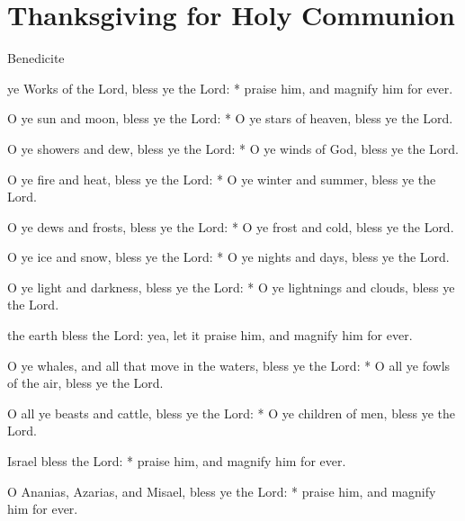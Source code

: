 \fancyhead[RE,LO]{}
\section{Thanksgiving for Holy Communion}\label{CommunionThanksgiving}%
\begin{multicols}{2}\par\noindent
{}
\begin{inhead}
	Benedicite
\end{inhead}
 ye Works of the Lord, bless ye the Lord: * praise him, and magnify him for ever.\par
{}

    O ye sun and moon, bless ye the Lord: * O ye stars of heaven, bless ye the Lord.
    
    O ye showers and dew, bless ye the Lord: * O ye winds of God, bless ye the Lord.
    
    O ye fire and heat, bless ye the Lord: * O ye winter and summer, bless ye the Lord.
    
    O ye dews and frosts, bless ye the Lord: * O ye frost and cold, bless ye the Lord.
    
    O ye ice and snow, bless ye the Lord: * O ye nights and days, bless ye the Lord.
    
    O ye light and darkness, bless ye the Lord: * O ye lightnings and clouds, bless ye the Lord.

\columnbreak
{} the earth bless the Lord: yea, let it praise him, and magnify him for ever.\par
{}
    O ye whales, and all that move in the waters, bless ye the Lord: * O all ye fowls of the air, bless ye the Lord.
    
    O all ye beasts and cattle, bless ye the Lord: * O ye children of men, bless ye the Lord.
    
 Israel bless the Lord: * praise him, and magnify him for ever.\par
{}
O Ananias, Azarias, and Misael, bless ye the Lord: * praise him, and magnify him for ever.


\end{multicols}
